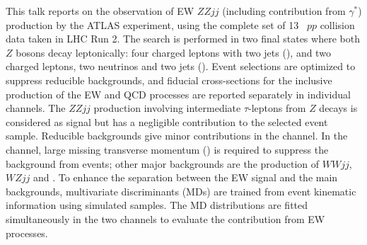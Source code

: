 This talk reports on the observation of EW $ZZjj$ (including contribution from $\gamma^*$) production by the ATLAS experiment, using the complete set of 13 \TeV~$pp$ collision data taken in LHC Run 2. The search is performed in two final states where both $Z$ bosons decay leptonically: four charged leptons with two jets (\lllljj), and two charged leptons, two neutrinos and two jets (\llvvjj).
Event selections are optimized to suppress reducible backgrounds, and fiducial cross-sections for the inclusive production of the EW and QCD processes are reported separately in individual channels.
The $ZZjj$ production involving intermediate $\tau$-leptons from $Z$ decays is considered as signal but has a negligible contribution to the selected event sample. Reducible backgrounds give minor contributions in the \lllljj channel.
In the \llvvjj channel, large missing transverse momentum (\met) is required to suppress the background from \Zjet events; other major backgrounds are the production of $WWjj$, $WZjj$ and \ttbar.
To enhance the separation between the EW signal and the main backgrounds, multivariate discriminants (MDs) are trained from event kinematic information using simulated samples.
The MD distributions are fitted simultaneously in the two channels to evaluate the contribution from EW processes.


